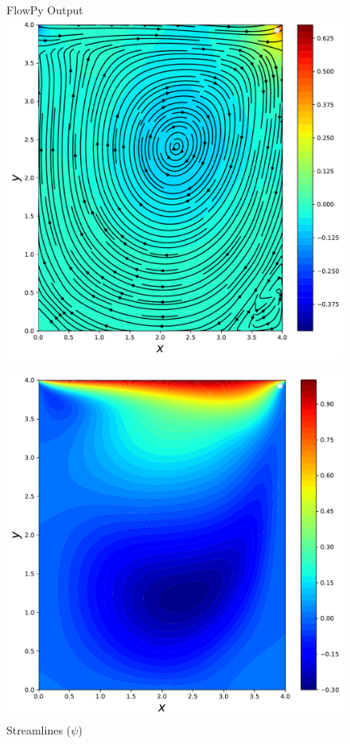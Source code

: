 \documentclass{article}
\begin{document}
    \begin{figure}[htb!]
    	    \centering \large{FlowPy Output} \\
      \includegraphics[width=\linewidth]{./images/Re400FlowPy_pres_stream}
      \caption{Streamlines ($\psi$)}
	  \label{fig:pres_example1}
    \endminipage\hfill
      \includegraphics[width=\linewidth]{./images/Re400FlowPy_u}

\end{figure}
\end{document}
